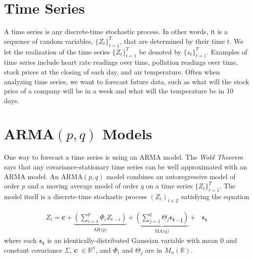 \label{lab:arma}

\section*{Time Series}


A time series is any discrete-time stochastic process.
In other words, it is a sequence of random variables, $\{Z_t\}_{t=1}^T$, that are determined by their time $t$.  We let the realization of the time series $\{Z_t\}_{t=1}^T$ be denoted by $\{z_t\}_{t=1}^T$.
Examples of time series include heart rate readings over time, pollution readings over time, stock prices at the closing of each day, and air temperature.
Often when analyzing time series, we want to forecast future data, such as what will the stock price of a company will be in a week and what will the temperature be in 10 days.

\section*{ARMA$(p,q)$ Models}

One way to forecast a time series is using an ARMA model.
The \emph{Wold Theorem} says that any covariance-stationary time series can be well approximated with an ARMA model.
An $\text{ARMA}(p,q)$ model combines an autoregressive model of order $p$ and a moving average model of order $q$ on a time series $\{Z_t\}_{t = 1}^T$.
The model itself is a discrete-time stochastic process $(Z_t)_{t \in \mathbb{Z}}$ satisfying the equation

\begin{align}
    \label{eq:arma:def}
    Z_t = \mathbf{c} + \underbrace{\left(\sum_{i=1}^p \Phi_{i}Z_{t - i}\right)}_\text{AR(p)} +
    \underbrace{\left(\sum_{j=1}^{q} \Theta_{j} \boldsymbol{\epsilon_{t-j}} \right)}_\text{MA(q)} + \text{ }\boldsymbol{\epsilon_t}
\end{align}
where each $\boldsymbol{\epsilon_t}$ is an identically-distributed Gaussian variable with mean 0 and constant covariance $\Sigma$, \textbf{c} $\in \mathbb{R}^n$, and $\Phi_i$ and $\Theta_j$ are in $M_n(\mathbb{R})$.

